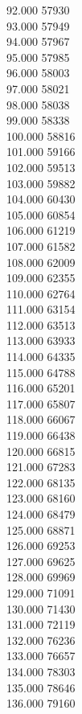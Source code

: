 { 92.000	57930 \\
 93.000	57949 \\
 94.000	57967 \\
 95.000	57985 \\
 96.000	58003 \\
 97.000	58021 \\
 98.000	58038 \\
 99.000	58338 \\
 100.000	58816 \\
 101.000	59166 \\
 102.000	59513 \\
 103.000	59882 \\
 104.000	60430 \\
 105.000	60854 \\
 106.000	61219 \\
 107.000	61582 \\
 108.000	62009 \\
 109.000	62355 \\
 110.000	62764 \\
 111.000	63154 \\
 112.000	63513 \\
 113.000	63933 \\
 114.000	64335 \\
 115.000	64788 \\
 116.000	65201 \\
 117.000	65807 \\
 118.000	66067 \\
 119.000	66438 \\
 120.000	66815 \\
 121.000	67283 \\
 122.000	68135 \\
 123.000	68160 \\
 124.000	68479 \\
 125.000	68871 \\
 126.000	69253 \\
 127.000	69625 \\
 128.000	69969 \\
 129.000	71091 \\
 130.000	71430 \\
 131.000	72119 \\
 132.000	76236 \\
 133.000	76657 \\
 134.000	78303 \\
 135.000	78646 \\
 136.000	79160 \\
}
